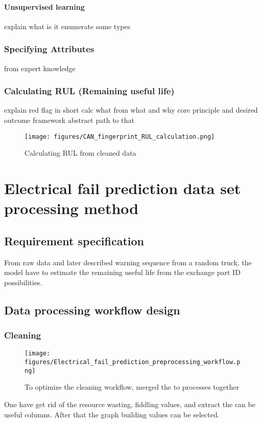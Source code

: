 		\paragraph{Unsupervised learning}
		explain what is it 
		enumerate some types
	\subsubsection{Specifying Attributes}
	from expert knowledge
	\subsubsection{Calculating RUL (Remaining useful life)}
	explain red flag in short
	calc what from what and why core principle and desired outcome framework abstract path to that
		\begin{figure}[!ht]
		\centering
		\texttt{[image: figures/CAN\_fingerprint\_RUL\_calculation.png]}
		\caption{Calculating RUL from cleaned data} 
		\end{figure}	
\section{Electrical fail prediction data set processing method}
	\subsection{Requirement specification}
From raw data and later described warning sequence from a random truck, the model have to estimate the remaining useful life from the exchange part ID possibilities.	
	\subsection{Data processing workflow design}
\cite{BALNWSCBOOK}
\cite{CSDISTILLED}
\cite{DATACAMP}
\cite{LeanThinking}
		\subsubsection{Cleaning}
		\begin{figure}[!ht]
		\centering
		\texttt{[image: figures/Electrical\_fail\_prediction\_preprocessing\_workflow.png]}
		\caption{To optimize the cleaning workflow, merged the to processes together} 
		\end{figure}
		One have get rid of the resource wasting, fiddling values, and extract the can be useful columns. After that the graph building values can be selected.

